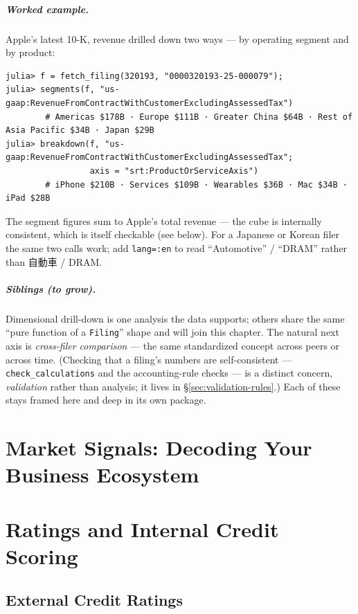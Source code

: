 \documentclass[11pt,a4paper]{report}
\newcommand{\jpcjk}[2]{{\cjkJPfont #1}}
\begin{document}
\paragraph{Worked example.} Apple's latest 10-K, revenue drilled down two ways --- by operating segment and
by product:

\begin{lstlisting}
julia> f = fetch_filing(320193, "0000320193-25-000079");
julia> segments(f, "us-gaap:RevenueFromContractWithCustomerExcludingAssessedTax")
        # Americas $178B · Europe $111B · Greater China $64B · Rest of Asia Pacific $34B · Japan $29B
julia> breakdown(f, "us-gaap:RevenueFromContractWithCustomerExcludingAssessedTax";
                 axis = "srt:ProductOrServiceAxis")
        # iPhone $210B · Services $109B · Wearables $36B · Mac $34B · iPad $28B
\end{lstlisting}

\noindent The segment figures sum to Apple's total revenue --- the cube is internally consistent, which is
itself checkable (see below). For a Japanese or Korean filer the same two calls work; add \texttt{lang=:en}
to read ``Automotive'' / ``DRAM'' rather than \jpcjk{自動車}{} / DRAM.

\paragraph{Siblings (to grow).} Dimensional drill-down is one analysis the data supports; others share the
same ``pure function of a \texttt{Filing}'' shape and will join this chapter. The natural next axis is
\emph{cross-filer comparison} --- the same standardized concept across peers or across time. (Checking that
a filing's numbers are self-consistent --- \texttt{check\_calculations} and the accounting-rule checks --- is
a distinct concern, \emph{validation} rather than analysis; it lives in \S\ref{sec:validation-rules}.) Each
of these stays framed here and deep in its own package.

\chapter{Market Signals: Decoding Your Business Ecosystem}

\chapter{Ratings and Internal Credit Scoring}
\label{ch:ratings}

\section{External Credit Ratings}
\end{document}
